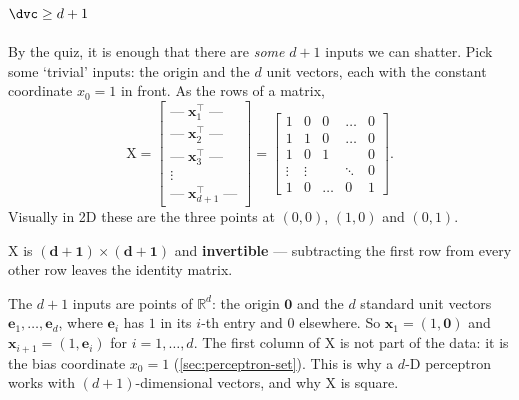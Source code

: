 \subsection{\texorpdfstring{\(\dvc \ge d + 1\)}{dVC >= d + 1}}

By the quiz, it is enough that there are \emph{some} \(d + 1\) inputs we can
shatter. Pick some `trivial' inputs: the origin and the \(d\) unit vectors,
each with the constant coordinate \(x_0 = 1\) in front. As the rows of a
matrix,
\[
    \mathrm{X} =
    \begin{bmatrix}
        \text{---}\; \bm{x}_1^\top \;\text{---}\\
        \text{---}\; \bm{x}_2^\top \;\text{---}\\
        \text{---}\; \bm{x}_3^\top \;\text{---}\\
        \vdots\\
        \text{---}\; \bm{x}_{d+1}^\top \;\text{---}
    \end{bmatrix}
    =
    \begin{bmatrix}
        1 & 0 & 0 & \dots & 0\\
        1 & 1 & 0 & \dots & 0\\
        1 & 0 & 1 & & 0\\
        \vdots & \vdots & & \ddots & 0\\
        1 & 0 & \dots & 0 & 1
    \end{bmatrix} .
\]
Visually in 2D these are the three points  at \((0,0)\), \((1,0)\) and
\((0,1)\).

\begin{note}
    \(\mathrm{X}\) is \(\bm{(d+1) \times (d+1)}\) and \textbf{invertible} ---
    subtracting the first row from every other row leaves the identity matrix.
\end{note}

\begin{remark}
    The \(d + 1\) inputs are points of \(\mathbb{R}^d\): the origin
    \(\bm{0}\) and the \(d\) standard unit vectors \(\bm{e}_1, \dots ,
    \bm{e}_d\), where \(\bm{e}_i\) has \(1\) in its \(i\)-th entry and \(0\)
    elsewhere. So \(\bm{x}_1 = (1, \bm{0})\) and \(\bm{x}_{i+1} = (1,
    \bm{e}_i)\) for \(i = 1, \dots , d\). The first column of \(\mathrm{X}\)
    is not part of the data: it is the bias coordinate \(x_0 = 1\)
    (\autoref{sec:perceptron-set}). This is why a \(d\)-D
    perceptron works with \((d+1)\)-dimensional vectors, and why
    \(\mathrm{X}\) is square.
\end{remark}

